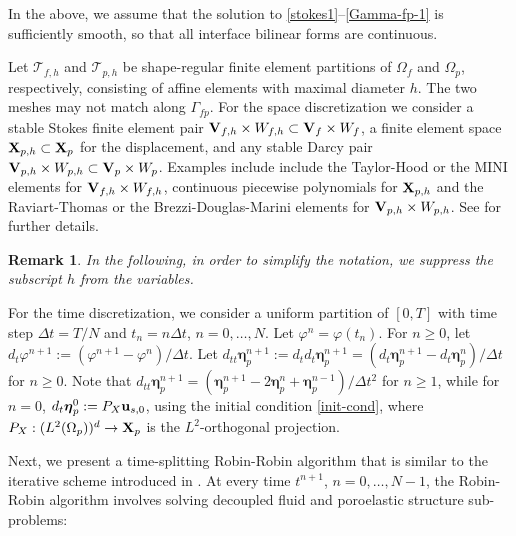 \documentclass[11pt]{article}
\def\u{{\bf u}}
\def\bbeta{\boldsymbol{\eta}}
\def\V{{\bf V}}
\def\X{{\bf X}}
\def\dt{d_t}
\def\dtt{d_{tt}}
\newtheorem{remark}{Remark}[section]
\begin{document}
%
In the above, we assume that the solution to \eqref{stokes1}--\eqref{Gamma-fp-1} is sufficiently smooth, so that all interface bilinear forms are continuous.

  {Let $\mathcal{T}_{f,h}$ and $\mathcal{T}_{p,h}$ be shape-regular finite element partitions of $\Omega_f$ and $\Omega_p$, respectively, consisting of affine elements with maximal diameter $h$. The two meshes may not match along $\Gamma_{fp}$.} For the space discretization we consider a stable Stokes finite element pair $\V_{f,h}\times W_{f,h} \subset \V_f\times W_f$, a finite element space $\X_{p,h} \subset \X_p$ for the displacement, and any stable Darcy pair $\V_{p,h}\times W_{p,h} \subset \V_p\times W_p$. Examples include include the Taylor-Hood or the MINI elements for $\V_{f,h}\times W_{f,h}$, continuous piecewise polynomials for $\X_{p,h}$ and the Raviart-Thomas or the Brezzi-Douglas-Marini elements for $\V_{p,h}\times W_{p,h}$. See \cite{boffi2013mixed} for further details.

  \begin{remark}
    In the following, in order to simplify the notation, we suppress the subscript $h$ from the variables.
  \end{remark}

For the time discretization, we consider a uniform partition of $[0,T]$ with time step $\Delta t = T/N$ and $t_n = n\Delta t$, $n = 0,\ldots,N$. Let $\varphi^{n} = \varphi(t_n)$.
For $n \ge 0$, let $\dt \varphi^{n+1} := (\varphi^{n+1} - \varphi^{n})/{\Delta t}$. Let
$\dtt\bbeta_p^{n+1} := \dt\dt\bbeta_p^{n+1} = (\dt\bbeta_p^{n+1} - \dt\bbeta_p^n)/\Delta t$ for $n \ge 0$. Note that $\dtt\bbeta_p^{n+1} = (\bbeta_p^{n+1} -2 \bbeta_p^{n}+\bbeta_p^{n-1})/{\Delta t^2}$ for $n \ge 1$, while for $n = 0$, $\dt\bbeta_p^0 := P_X\u_{s,0}$, using the initial condition \eqref{init-cond}, where $P_X:(L^2(\Omega_p))^d \to \X_p$ is the $L^2$-orthogonal projection.
%

{Next, we present a time-splitting Robin-Robin algorithm that is similar to the iterative scheme introduced in \cite{bqq2009}.} At every time $t^{n+1}$, $n = 0,\ldots,N-1$, the Robin-Robin algorithm involves solving decoupled fluid and poroelastic structure sub-problems:
%

\medskip
\end{document}
